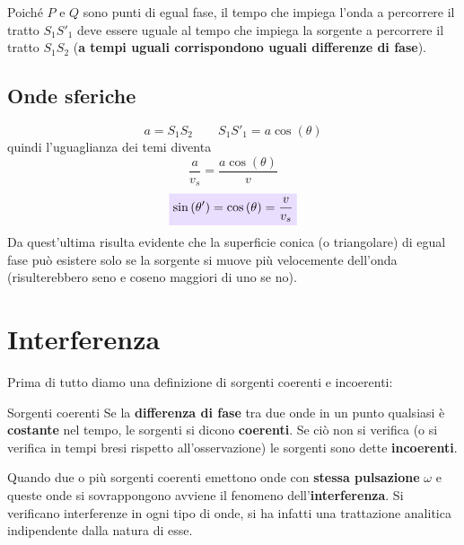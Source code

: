 \documentclass[x11names]{report}
\newcommand{\viola}[1]{\colorbox{yred}{$\displaystyle #1$}}
\begin{document}
	Poiché \(P\) e \(Q\) sono punti di egual fase, il tempo che impiega l'onda a percorrere il tratto \(S_1S'_1\) deve essere uguale al tempo che impiega la sorgente a percorrere il tratto \(S_1S_2\) (\textbf{a tempi uguali corrispondono uguali differenze di fase}).
	\subsection{Onde sferiche}
	
	\[ 
	\boxed{a = S_1S_2} \qquad \boxed{S_1S'_1 = a\cos\left(\theta\right)}
	\]
	quindi l'uguaglianza dei temi diventa
	\[ 
	\frac{a}{v_s} = \frac{a\cos\left(\theta\right)}{v}
	\]
	\begin{equation}
		\viola{\sin\left(\theta'\right) = \cos\left(\theta\right) = \frac{v}{v_s} }
	\end{equation}
	Da quest'ultima risulta evidente che la superficie conica (o triangolare) di egual fase può esistere solo se la sorgente si muove più velocemente dell'onda (risulterebbero seno e coseno maggiori di uno se no).
	
	
	\section{Interferenza}	
	Prima di tutto diamo una definizione di sorgenti coerenti e incoerenti:
	\begin{center}
		\colorbox{yblue}{\begin{minipage}{5.75in}
				\begin{blues}{Sorgenti coerenti}
					Se la \textbf{differenza di fase} tra due onde in un punto qualsiasi è \textbf{costante} nel tempo, le sorgenti si dicono \textbf{coerenti}. Se ciò non si verifica (o si verifica in tempi bresi rispetto all'osservazione) le sorgenti sono dette \textbf{incoerenti}.
				\end{blues}
		\end{minipage}}
	\end{center}
	Quando due o più sorgenti coerenti emettono onde con \textbf{stessa pulsazione} \(\omega\) e queste onde si sovrappongono avviene il fenomeno dell'\textbf{interferenza}. Si verificano interferenze in ogni tipo di onde, si ha infatti una trattazione analitica indipendente dalla natura di esse.
	
\end{document}
